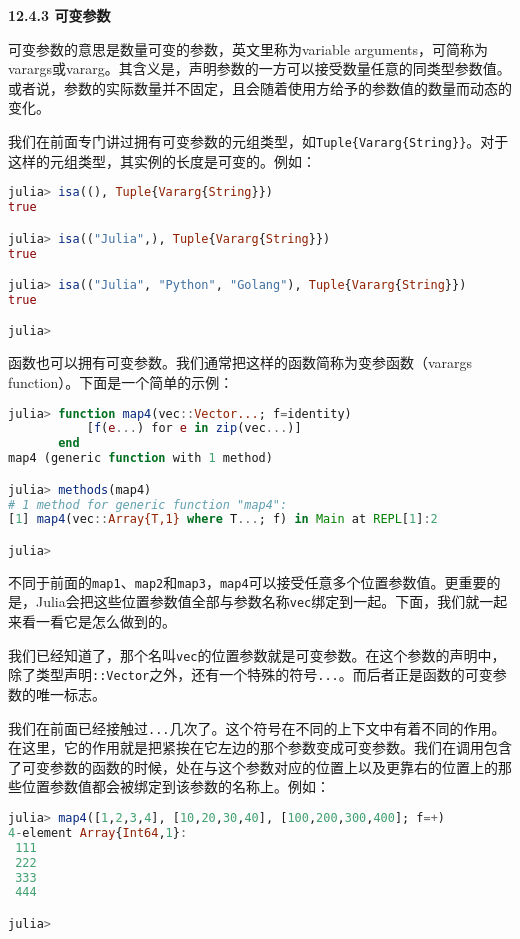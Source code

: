 \textbf{12.4.3 可变参数}

可变参数的意思是数量可变的参数，英文里称为variable arguments，可简称为varargs或vararg。其含义是，声明参数的一方可以接受数量任意的同类型参数值。或者说，参数的实际数量并不固定，且会随着使用方给予的参数值的数量而动态的变化。

我们在前面专门讲过拥有可变参数的元组类型，如\verb|Tuple{Vararg{String}}|。对于这样的元组类型，其实例的长度是可变的。例如：

\begin{lstlisting}[language=julia]
julia> isa((), Tuple{Vararg{String}})
true

julia> isa(("Julia",), Tuple{Vararg{String}})
true

julia> isa(("Julia", "Python", "Golang"), Tuple{Vararg{String}})
true

julia> 
\end{lstlisting}

函数也可以拥有可变参数。我们通常把这样的函数简称为变参函数（varargs function）。下面是一个简单的示例：

\begin{lstlisting}[language=julia]
julia> function map4(vec::Vector...; f=identity)
           [f(e...) for e in zip(vec...)]
       end
map4 (generic function with 1 method)

julia> methods(map4)
# 1 method for generic function "map4":
[1] map4(vec::Array{T,1} where T...; f) in Main at REPL[1]:2

julia>  
\end{lstlisting}

不同于前面的\verb|map1|、\verb|map2|和\verb|map3|，\verb|map4|可以接受任意多个位置参数值。更重要的是，Julia会把这些位置参数值全部与参数名称\verb|vec|绑定到一起。下面，我们就一起来看一看它是怎么做到的。

我们已经知道了，那个名叫\verb|vec|的位置参数就是可变参数。在这个参数的声明中，除了类型声明\verb|::Vector|之外，还有一个特殊的符号\verb|...|。而后者正是函数的可变参数的唯一标志。

我们在前面已经接触过\verb|...|几次了。这个符号在不同的上下文中有着不同的作用。在这里，它的作用就是把紧挨在它左边的那个参数变成可变参数。我们在调用包含了可变参数的函数的时候，处在与这个参数对应的位置上以及更靠右的位置上的那些位置参数值都会被绑定到该参数的名称上。例如：

\begin{lstlisting}[language=julia]
julia> map4([1,2,3,4], [10,20,30,40], [100,200,300,400]; f=+)
4-element Array{Int64,1}:
 111
 222
 333
 444

julia> 
\end{lstlisting}

